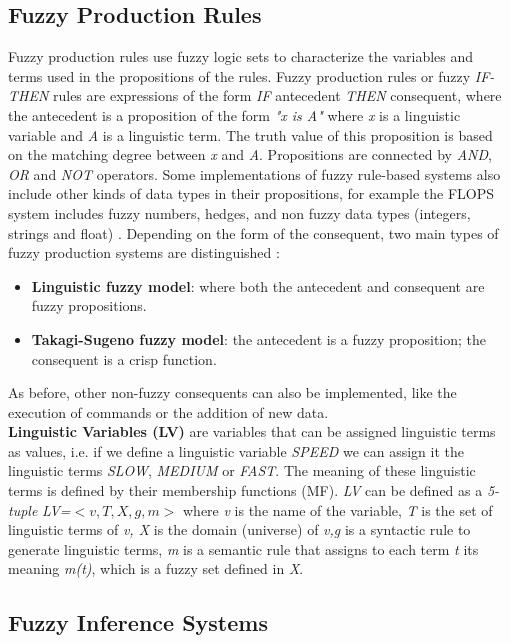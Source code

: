 \subsection{Fuzzy Production Rules}

Fuzzy production rules use fuzzy logic sets to characterize the
variables and terms used in the propositions of the rules. Fuzzy
production rules or fuzzy \textit{IF-THEN} rules are expressions of
the form \textit{IF} antecedent \textit{THEN} consequent, where the
antecedent is a proposition of the form \textit{"x is A"} where
\textit{x} is a linguistic variable and \textit{A} is a linguistic
term. The truth value of this proposition is based on the matching
degree between \textit{x} and \textit{A}. Propositions are connected
by \textit{AND}, \textit{OR} and \textit{NOT} operators. Some
implementations of fuzzy rule-based systems also include other kinds
of data types in their propositions, for example the FLOPS system
includes fuzzy numbers, hedges, and non fuzzy data types (integers,
strings and float) \cite{siler2005fuzzy}. Depending on the form of the
consequent, two main types of fuzzy production systems are
distinguished \cite{babuvska1996fuzzy}:
\begin{itemize}  
\item \textbf{Linguistic fuzzy model}: where both the antecedent 
and consequent are fuzzy propositions.
\item \textbf{Takagi-Sugeno fuzzy model}: the antecedent is a fuzzy 
proposition; the consequent is a crisp function.
\end{itemize}  
As before, other non-fuzzy consequents can also be implemented, like
the execution of commands or the addition of new data.\\
\textbf{Linguistic Variables (LV)} are variables that can be assigned
linguistic terms as values, i.e. if we define a linguistic variable
\textit{SPEED} we can assign it the linguistic terms \textit{SLOW},
\textit{MEDIUM} or \textit{FAST}. The meaning of these linguistic
terms is defined by their membership functions (MF). \textit{LV} can
be defined as a \textit{5-tuple} \textit{LV=}$<v,T,X,g,m>$ where
\textit{v} is the name of the variable, \textit{T} is the set of
linguistic terms of \textit{v, X} is the domain (universe) of
\textit{v,g} is a syntactic rule to generate linguistic terms,
\textit{m} is a semantic rule that assigns to each term \textit{t} its
meaning \textit{m(t)}, which is a fuzzy set defined in \textit{X}.

\subsection{Fuzzy Inference Systems}


